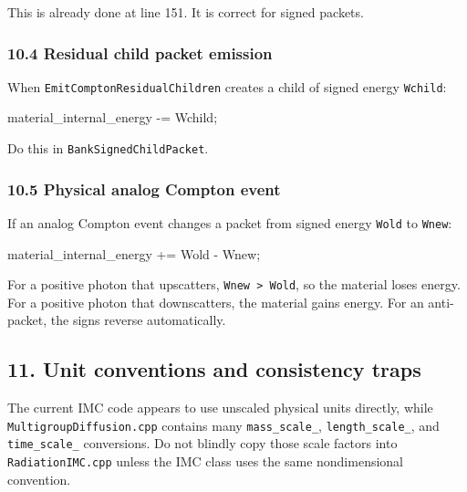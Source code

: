 \documentclass[
]{article}
\newenvironment{Shaded}{}{}
\newcommand{\NormalTok}[1]{#1}
\newcommand{\OperatorTok}[1]{\textcolor[rgb]{0.40,0.40,0.40}{#1}}
\begin{document}
This is already done at line 151. It is correct for signed packets.

\subsubsection{10.4 Residual child packet
emission}\label{residual-child-packet-emission}

When \texttt{EmitComptonResidualChildren} creates a child of signed
energy \texttt{Wchild}:

\begin{Shaded}
\begin{Highlighting}[]
\NormalTok{material\_internal\_energy }\OperatorTok{{-}=}\NormalTok{ Wchild}\OperatorTok{;}
\end{Highlighting}
\end{Shaded}

Do this in \texttt{BankSignedChildPacket}.

\subsubsection{10.5 Physical analog Compton
event}\label{physical-analog-compton-event}

If an analog Compton event changes a packet from signed energy
\texttt{Wold} to \texttt{Wnew}:

\begin{Shaded}
\begin{Highlighting}[]
\NormalTok{material\_internal\_energy }\OperatorTok{+=}\NormalTok{ Wold }\OperatorTok{{-}}\NormalTok{ Wnew}\OperatorTok{;}
\end{Highlighting}
\end{Shaded}

For a positive photon that upscatters,
\texttt{Wnew\ \textgreater{}\ Wold}, so the material loses energy. For a
positive photon that downscatters, the material gains energy. For an
anti-packet, the signs reverse automatically.

\subsection{11. Unit conventions and consistency
traps}\label{unit-conventions-and-consistency-traps}

The current IMC code appears to use unscaled physical units directly,
while \texttt{MultigroupDiffusion.cpp} contains many
\texttt{mass\_scale\_}, \texttt{length\_scale\_}, and
\texttt{time\_scale\_} conversions. Do not blindly copy those scale
factors into \texttt{RadiationIMC.cpp} unless the IMC class uses the
same nondimensional convention.
\end{document}
